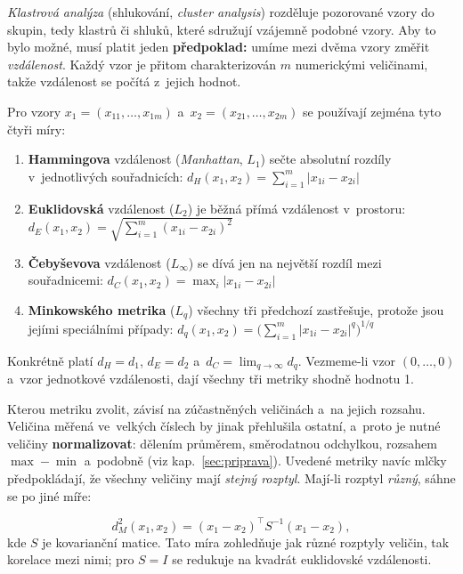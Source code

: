 \documentclass[11pt,a4paper]{article}
\theoremstyle{definition}
\begin{document}
\emph{Klastrová analýza} (shlukování, \emph{cluster analysis}) rozděluje pozorované vzory do
skupin, tedy klastrů či shluků, které sdružují vzájemně podobné vzory. Aby to bylo možné,
musí platit jeden \textbf{předpoklad:} umíme mezi dvěma vzory změřit \emph{vzdálenost}.
Každý vzor je přitom charakterizován $m$ numerickými veličinami, takže vzdálenost se počítá
z~jejich hodnot.

\begin{defbox}
Pro vzory $x_1=(x_{11},\dots,x_{1m})$ a~$x_2=(x_{21},\dots,x_{2m})$ se používají zejména tyto
čtyři míry:
\begin{enumerate}
\item \textbf{Hammingova} vzdálenost (\emph{Manhattan}, $L_1$) sečte absolutní rozdíly
      v~jednotlivých souřadnicích:
      $d_H(x_1,x_2)=\sum_{i=1}^{m}|x_{1i}-x_{2i}|$
\item \textbf{Euklidovská} vzdálenost ($L_2$) je běžná přímá vzdálenost v~prostoru:
      $d_E(x_1,x_2)=\sqrt{\sum_{i=1}^{m}(x_{1i}-x_{2i})^2}$
\item \textbf{Čebyševova} vzdálenost ($L_\infty$) se dívá jen na největší rozdíl mezi
      souřadnicemi:
      $d_C(x_1,x_2)=\max_i |x_{1i}-x_{2i}|$
\item \textbf{Minkowského metrika} ($L_q$) všechny tři předchozí zastřešuje, protože jsou
      jejími speciálními případy:
      $d_q(x_1,x_2)=\Big(\sum_{i=1}^{m}|x_{1i}-x_{2i}|^{q}\Big)^{1/q}$
\end{enumerate}
Konkrétně platí $d_H=d_1$, $d_E=d_2$ a~$d_C=\lim_{q\to\infty}d_q$. Vezmeme-li vzor
$(0,\dots,0)$ a~vzor jednotkové vzdálenosti, dají všechny tři metriky shodně hodnotu 1.
\end{defbox}

Kterou metriku zvolit, závisí na zúčastněných veličinách a~na jejich rozsahu. Veličina
měřená ve~velkých číslech by jinak přehlušila ostatní, a~proto je nutné veličiny
\textbf{normalizovat}: dělením průměrem, směrodatnou odchylkou, rozsahem $\max-\min$
a~podobně (viz kap.~\ref{sec:priprava}). Uvedené metriky navíc mlčky předpokládají, že
všechny veličiny mají \emph{stejný rozptyl}. Mají-li rozptyl \emph{různý}, sáhne se po jiné
míře:

\begin{defbox}
\[ d_M^2(x_1,x_2)=(x_1-x_2)^{\!\top}S^{-1}(x_1-x_2), \]
kde $S$ je kovarianční matice. Tato míra zohledňuje jak různé rozptyly veličin, tak korelace
mezi nimi; pro $S=I$ se redukuje na kvadrát euklidovské vzdálenosti.
\end{defbox}
\end{document}
